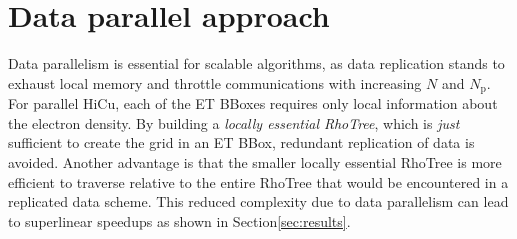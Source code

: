 \commentoutA{\documentclass[prl,aps,twocolumn,showpacs,twocolumngrid,superbib]{revtex4}}
\newcommand{\Np}{N_{\mathrm{p}}} \newcommand{\Nbox}{N_{\mathrm{b}}}
\begin{document}

\section{Data parallel approach}
\label{sec:data-locality}

Data parallelism is essential for scalable algorithms, as data
replication stands to exhaust local memory and throttle communications
with increasing $N$ and $\Np$.  For parallel HiCu, each of the ET
BBoxes requires only local information about the electron density.  By
building a {\it locally essential RhoTree}, which is {\it just}
sufficient to create the grid in an ET BBox, redundant replication of
data is avoided.  Another advantage is that the smaller locally essential 
RhoTree is more efficient to traverse relative to the entire RhoTree
that would be encountered in a replicated data scheme. This reduced complexity 
due to data parallelism can lead to superlinear speedups as shown in 
Section\ref{sec:results}.
\end{document}
